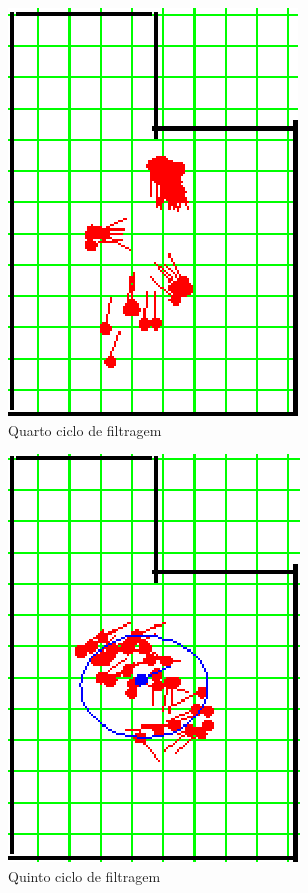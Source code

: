 \begin{figure}[H]
  \centering
  \includegraphics[scale=1]{figuras/cen3_ex5/5.eps}
  \caption[Quarto Ciclo de Filtragem]{Quarto ciclo de filtragem}
  \label{img:cen3_ex5_5}
\end{figure}

\begin{figure}[H]
  \centering
  \includegraphics[scale=1]{figuras/cen3_ex5/6.eps}
  \caption[Quinto Ciclo de Filtragem]{Quinto ciclo de filtragem}
  \label{img:cen3_ex5_6}
\end{figure}

